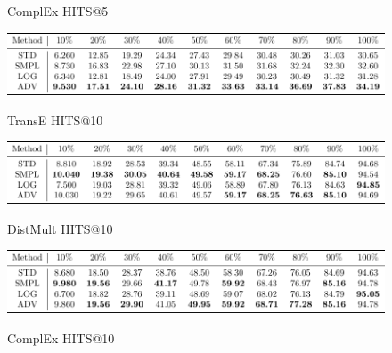 \documentclass{article}
\begin{document}
\begin{figure}
\caption{ComplEx HITS@5}
\end{figure}\begin{figure}
\includegraphics[]{results_TransE_HITS@10}\\
\caption{TransE HITS@10}
\end{figure}\begin{figure}
\includegraphics[]{results_DistMult_HITS@10}\\
\caption{DistMult HITS@10}
\end{figure}\begin{figure}
\includegraphics[]{results_ComplEx_HITS@10}\\
\caption{ComplEx HITS@10}
\end{figure}
\end{document}
